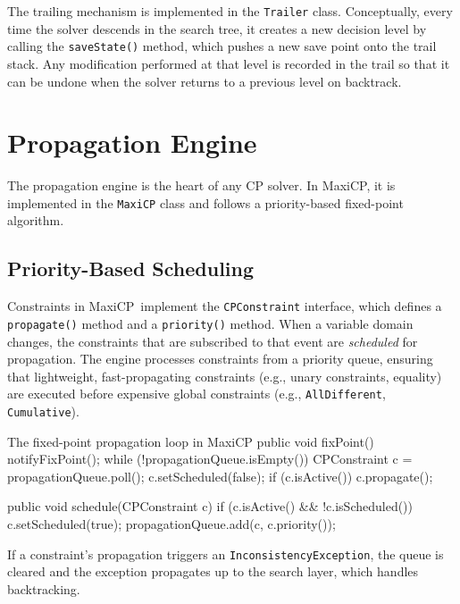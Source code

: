 \documentclass[11pt, a4paper]{scrartcl}
\newcommand{\maxicp}{\textsf{MaxiCP}}
\begin{document}
The trailing mechanism is implemented in the \texttt{Trailer} class.
Conceptually, every time the solver descends in the search tree, it creates a new decision level by calling the \texttt{saveState()} method,
which pushes a new save point onto the trail stack.
Any modification performed at that level is recorded in the trail so that it can be undone when the solver returns to a previous level on backtrack.

\section{Propagation Engine}
\label{sec:propagation}

The propagation engine is the heart of any CP solver. In \maxicp, it is implemented in the \texttt{MaxiCP} class and follows a priority-based fixed-point algorithm.

\subsection{Priority-Based Scheduling}

Constraints in \maxicp\ implement the \texttt{CPConstraint} interface, which defines a \texttt{propagate()} method and a \texttt{priority()} method. When a variable domain changes, the constraints that are subscribed to that event are \emph{scheduled} for propagation. The engine processes constraints from a priority queue, ensuring that lightweight, fast-propagating constraints (e.g., unary constraints, equality) are executed before expensive global constraints (e.g., \texttt{AllDifferent}, \texttt{Cumulative}).

\begin{codebox}{The fixed-point propagation loop in MaxiCP}
public void fixPoint() {
    notifyFixPoint();
    while (!propagationQueue.isEmpty()) {
        CPConstraint c = propagationQueue.poll();
        c.setScheduled(false);
        if (c.isActive())
            c.propagate();
    }
}

public void schedule(CPConstraint c) {
    if (c.isActive() && !c.isScheduled()) {
        c.setScheduled(true);
        propagationQueue.add(c, c.priority());
    }
}
\end{codebox}

If a constraint's propagation triggers an \texttt{InconsistencyException}, the queue is cleared and the exception propagates up to the search layer, which handles backtracking.
\end{document}
